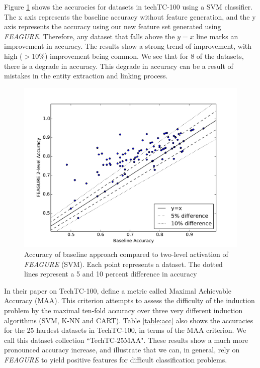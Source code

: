 \documentclass{article}
\theoremstyle{definition}
\begin{document}
Figure \ref{fig:svm_base_lvl2} shows the accuracies for datasets in techTC-100 using a SVM classifier. The x axis represents the baseline accuracy without feature generation, and the y axis represents the accuracy using our new feature set generated using \emph{FEAGURE}. Therefore, any dataset that falls above the $y=x$ line marks an improvement in accuracy. 
The results show a strong trend of improvement, with high ($>10\%$) improvement being common.
We see that for 8 of the datasets, there is a degrade in accuracy. This degrade in accuracy can be a result of mistakes in the entity extraction and linking process.

\begin{figure}
	\centering
	\includegraphics[width=0.7\linewidth]{svm_full_lvl2}
	\caption{Accuracy of
		baseline approach compared to two-level activation of \emph{FEAGURE} (SVM). Each point represents a dataset. The dotted lines represent a 5 and 10 percent difference in accuracy}
	\label{fig:svm_base_lvl2}
\end{figure}


In their paper on TechTC-100, \cite{gabrilovich2004text} define a metric called Maximal Achievable Accuracy (MAA). This criterion attempts to assess the difficulty of the induction problem by the maximal ten-fold accuracy over three very different induction algorithms (SVM, K-NN and CART).
Table \ref{table:acc} also shows the accuracies for the 25 hardest datasets in TechTC-100, in terms of the MAA criterion. We call this dataset collection ``TechTC-25MAA". 
These results show a much more pronounced accuracy increase, and illustrate that we can, in general, rely on \emph{FEAGURE} to yield positive features for difficult classification problems.
\end{document}
